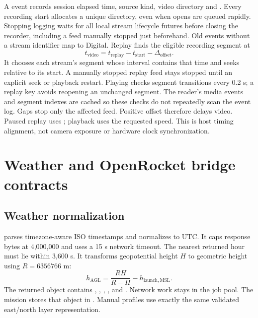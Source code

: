 A  event records session elapsed time, source kind,
video directory and . Every recording start allocates a unique
 directory, even when opens are queued rapidly.
Stopping logging waits for all local stream lifecycle futures before closing the recorder,
including a feed manually stopped just beforehand. Old events without a stream
identifier map to Digital. Replay finds the eligible recording segment at
\[
 t_{\mathrm{video}}=t_{\mathrm{replay}}-t_{\mathrm{start}}-\Delta_{\mathrm{offset}}.
\]
It chooses each stream's segment whose interval contains that time and seeks
relative to its start. A manually stopped replay feed stays stopped until an
explicit seek or playback restart. Playing checks segment transitions every 0.2 s; a replay
key avoids reopening an unchanged segment. The reader's media events and
segment indexes are cached so these checks do not repeatedly scan the event log. Gaps stop only the affected feed. Positive offset therefore delays video. Paused replay uses
; playback uses the requested speed. This is host timing
alignment, not camera exposure or hardware clock synchronization.

\section{Weather and OpenRocket bridge contracts}\label{sec:bridge}
\subsection{Weather normalization}
 parses timezone-aware ISO timestamps and normalizes to
UTC. It caps response bytes at 4,000,000 and uses a 15 s network timeout. The
nearest returned hour must lie within 3,600 s. It transforms geopotential height
\(H\) to geometric height using \(R=6356766\) m:
\[
 h_{\mathrm{AGL}}=\frac{RH}{R-H}-h_{\mathrm{launch,MSL}}.
\]
The returned object contains , , ,
,  and . Network work stays in the
job pool. The mission stores that object in . Manual profiles
use exactly the same validated east/north layer representation.

